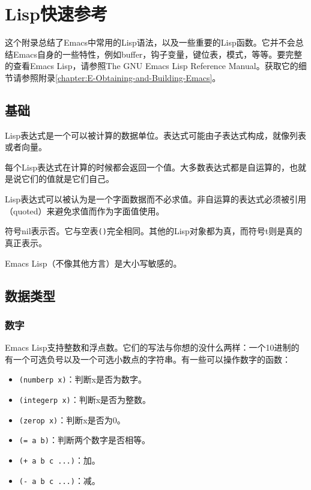 \chapter{Lisp快速参考}
\label{chapter:B-Lisp-Quick-Reference}


这个附录总结了Emacs中常用的Lisp语法，以及一些重要的Lisp函数。它并不会总结Emacs自身的一些特性，例如buffer，钩子变量，键位表，模式，等等。要完整的查看Emacs Lisp，请参照The GNU Emacs Lisp Reference Manual。获取它的细节请参照附录\ref{chapter:E-Obtaining-and-Building-Emacs}。

\section{基础}
\label{section:B-Basics}

Lisp表达式是一个可以被计算的数据单位。表达式可能由子表达式构成，就像列表或者向量。

每个Lisp表达式在计算的时候都会返回一个值。大多数表达式都是自运算的，也就是说它们的值就是它们自己。

Lisp表达式可以被认为是一个字面数据而不必求值。非自运算的表达式必须被引用（quoted）来避免求值而作为字面值使用。

符号nil表示否。它与空表\texttt{()}完全相同。其他的Lisp对象都为真，而符号t则是真的真正表示。

Emacs Lisp（不像其他方言）是大小写敏感的。

\section{数据类型}
\label{section:B-Data-Types}

\subsection{数字}
\label{section:B-Numbers}

Emacs Lisp支持整数和浮点数。它们的写法与你想的没什么两样：一个10进制的有一个可选负号以及一个可选小数点的字符串。有一些可以操作数字的函数：

\begin{itemize}
  \item \texttt{(numberp x)}：判断x是否为数字。
  \item \texttt{(integerp x)}：判断x是否为整数。
  \item \texttt{(zerop x)}：判断x是否为0。
  \item \texttt{(= a b)}：判断两个数字是否相等。
  \item \texttt{(+ a b c ...)}：加。
  \item \texttt{(- a b c ...)}：减。
\end{itemize}

